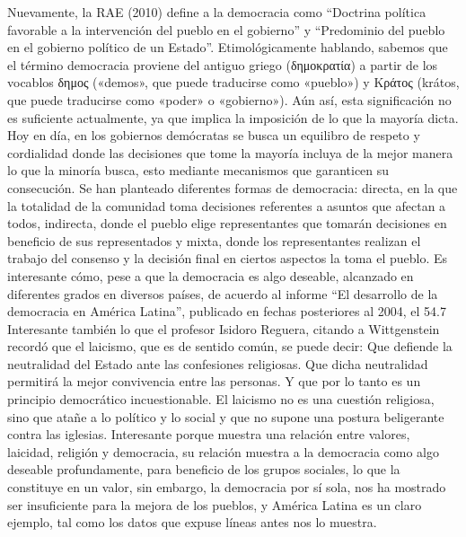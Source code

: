 Nuevamente, la RAE (2010) define a la democracia como “Doctrina política favorable a la intervención del pueblo en el gobierno” y “Predominio del pueblo en el gobierno político de un Estado”. Etimológicamente hablando, sabemos que el término democracia proviene del antiguo griego (δημοκρατία) a partir de los vocablos δημος («demos», que puede traducirse como «pueblo») y Κράτος (krátos, que puede traducirse como «poder» o «gobierno»). Aún así, esta significación no es suficiente actualmente, ya que implica la imposición de lo que la mayoría dicta. Hoy en día, en los gobiernos demócratas se busca un equilibro de respeto y cordialidad donde las decisiones que tome la mayoría incluya de la mejor manera lo que la minoría busca, esto mediante mecanismos que garanticen su consecución. Se han planteado diferentes formas de democracia: directa, en la que la totalidad de la comunidad toma decisiones referentes a asuntos que afectan a todos, indirecta, donde el pueblo elige representantes que tomarán decisiones en beneficio de sus representados y mixta, donde los representantes realizan el trabajo del consenso y la decisión final en ciertos aspectos la toma el pueblo.
Es interesante cómo, pese a que la democracia es algo deseable, alcanzado en diferentes grados en diversos países, de acuerdo al informe “El desarrollo de la democracia en América Latina”, publicado en fechas posteriores al 2004, el 54.7%
Interesante también lo que el profesor Isidoro Reguera, citando a Wittgenstein recordó que el laicismo, que es de sentido común, se puede decir: Que defiende la neutralidad del Estado ante las confesiones religiosas. Que dicha neutralidad permitirá la mejor convivencia entre las personas. Y que por lo tanto es un principio democrático incuestionable. El laicismo no es una cuestión religiosa, sino que atañe a lo político y lo social y que no supone una postura beligerante contra las iglesias. Interesante porque muestra una relación entre valores, laicidad, religión y democracia, su relación muestra a la democracia como algo deseable profundamente, para beneficio de los grupos sociales, lo que la constituye en un valor, sin embargo, la democracia por sí sola, nos ha mostrado ser insuficiente para la mejora de los pueblos, y América Latina es un claro ejemplo, tal como los datos que expuse líneas antes nos lo muestra.

